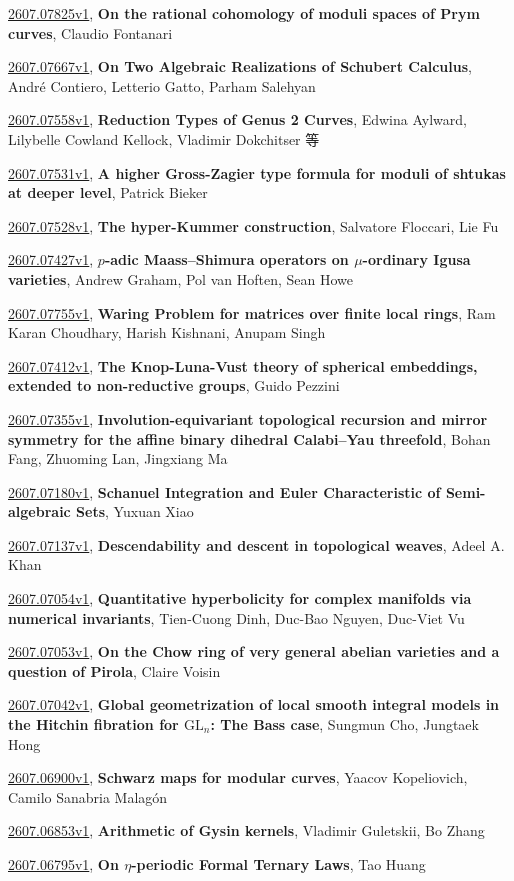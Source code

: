\documentclass[9pt, a4paper]{article}
\theoremstyle{plain}
\theoremstyle{definition}
\theoremstyle{remark}
\newcommand{\arxiv}[3]{\href{https://arxiv.org/abs/#1}{#1}, \textbf{\textcolor{arxivblue}{#2}}, #3}
\begin{document}
\arxiv{2607.07825v1}{On the rational cohomology of moduli spaces of Prym curves}{Claudio Fontanari}

\arxiv{2607.07667v1}{On Two Algebraic Realizations of Schubert Calculus}{André Contiero, Letterio Gatto, Parham Salehyan}

\arxiv{2607.07558v1}{Reduction Types of Genus 2 Curves}{Edwina Aylward, Lilybelle Cowland Kellock, Vladimir Dokchitser 等}

\arxiv{2607.07531v1}{A higher Gross-Zagier type formula for moduli of shtukas at deeper level}{Patrick Bieker}

\arxiv{2607.07528v1}{The hyper-Kummer construction}{Salvatore Floccari, Lie Fu}

\arxiv{2607.07427v1}{$p$-adic Maass--Shimura operators on $μ$-ordinary Igusa varieties}{Andrew Graham, Pol van Hoften, Sean Howe}

\arxiv{2607.07755v1}{Waring Problem for matrices over finite local rings}{Ram Karan Choudhary, Harish Kishnani, Anupam Singh}

\arxiv{2607.07412v1}{The Knop-Luna-Vust theory of spherical embeddings, extended to non-reductive groups}{Guido Pezzini}

\arxiv{2607.07355v1}{Involution-equivariant topological recursion and mirror symmetry for the affine binary dihedral Calabi--Yau threefold}{Bohan Fang, Zhuoming Lan, Jingxiang Ma}

\arxiv{2607.07180v1}{Schanuel Integration and Euler Characteristic of Semi-algebraic Sets}{Yuxuan Xiao}

\arxiv{2607.07137v1}{Descendability and descent in topological weaves}{Adeel A. Khan}

\arxiv{2607.07054v1}{Quantitative hyperbolicity for complex manifolds via numerical invariants}{Tien-Cuong Dinh, Duc-Bao Nguyen, Duc-Viet Vu}

\arxiv{2607.07053v1}{On the Chow ring of very general abelian varieties and a question of Pirola}{Claire Voisin}

\arxiv{2607.07042v1}{Global geometrization of local smooth integral models in the Hitchin fibration for $\mathrm{GL}_n$: The Bass case}{Sungmun Cho, Jungtaek Hong}

\arxiv{2607.06900v1}{Schwarz maps for modular curves}{Yaacov Kopeliovich, Camilo Sanabria Malagón}

\arxiv{2607.06853v1}{Arithmetic of Gysin kernels}{Vladimir Guletskii, Bo Zhang}

\arxiv{2607.06795v1}{On $η$-periodic Formal Ternary Laws}{Tao Huang}
\end{document}
